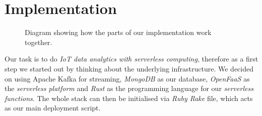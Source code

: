 \section{Implementation}

\begin{figure}[H]
  \caption{
    Diagram showing how the parts of our implementation work together.
    \cite{smartphone-icon, browser-icon}
  }
\end{figure}

Our task is to do \textit{IoT data analytics with serverless computing}, therefore as a first step
we started out by thinking about the underlying infrastructure. We decided on using Apache Kafka for
streaming, \textit{MongoDB} as our database, \textit{OpenFaaS} as the \textit{serverless platform} and
\textit{Rust} as the programming language for our \textit{serverless functions}. The whole stack can then be
initialised via \textit{Ruby Rake} file, which acts as our main deployment script.










